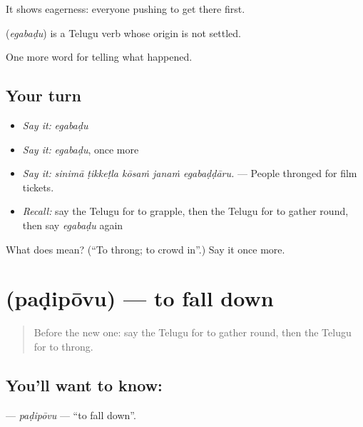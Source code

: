 It shows eagerness: everyone pushing to get there first.

\begin{cousinweb}
\textbf{} (\emph{egabaḍu}) is a Telugu verb whose origin is not settled.
\end{cousinweb}

\begin{grammarlens}[title={What you've built}]
One more word for telling what happened.
\end{grammarlens}

\subsection*{Your turn}
\begin{itemize}
\raggedright
  \item \emph{Say it:} \emph{egabaḍu}
  \item \emph{Say it:} \emph{egabaḍu}, once more
  \item \emph{Say it:} \emph{sinimā ṭikkeṭla kōsaṁ janaṁ egabaḍḍāru.} — People thronged for film tickets.
  \item \emph{Recall:} say the Telugu for to grapple, then the Telugu for to gather round, then say \emph{egabaḍu} again
\end{itemize}

\begin{tcolorbox}[breakable,colback=teal!4,colframe=teal!35!black,title={Before you move on}]
What does  mean? (\textquotedblleft{}To throng; to crowd in\textquotedblright{}.) Say it once more.
\end{tcolorbox}
\section[\texorpdfstring{\te{పడిపోవు} (paḍipōvu)}{పడిపోవు (paḍipōvu)}]{ (paḍipōvu) — to fall down}

\label{lesson:TE-C379-padipovu}



\begin{quote}
Before the new one: say the Telugu for to gather round, then the Telugu for to throng.
\end{quote}

\subsection*{You'll want to know: }
\textbf{} — \emph{paḍipōvu} — \textquotedblleft{}to fall down\textquotedblright{}.

